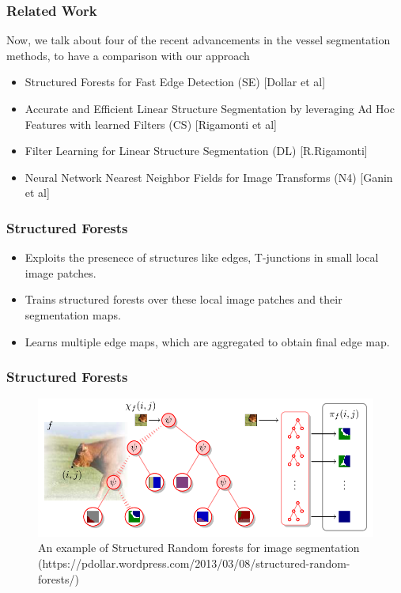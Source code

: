 \documentclass{beamer}
\begin{document}
	\begin{frame}
		\frametitle{Related Work}
		Now, we talk about four of the recent advancements in the vessel segmentation methods, to have a comparison with our approach
		\begin{itemize}
			
			\item Structured Forests for Fast Edge Detection (SE) [Dollar et al]
			\item Accurate and Efficient Linear Structure Segmentation by leveraging Ad Hoc Features with learned Filters (CS) [Rigamonti et al]
			\item Filter Learning for Linear Structure Segmentation (DL) [R.Rigamonti]
			\item Neural Network Nearest Neighbor Fields for Image Transforms (N4) [Ganin et al]
		\end{itemize}
		
	\end{frame}
	

	
	\begin{frame}
		\frametitle{Structured Forests}

			\begin{itemize}
				\item Exploits the presenece of structures like edges, T-junctions in small local image patches.
				\item Trains structured forests over these local image patches and their segmentation maps. 
				\item Learns multiple edge maps, which are aggregated to obtain final edge map.
			\end{itemize}
		
	\end{frame}
	\begin{frame}
		\frametitle{Structured Forests}
		\begin{figure}
			\includegraphics[width=\linewidth]{methods/se.png}
			\caption{An example of Structured Random forests for image segmentation (https://pdollar.wordpress.com/2013/03/08/structured-random-forests/)}
		\end{figure}

	\end{frame}
	
\end{document}
